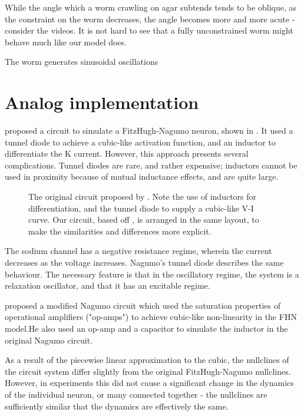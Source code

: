 \documentclass[
    11pt,
]{article}
\begin{document}
While the angle which a worm crawling on agar subtends tends to be oblique, as the constraint on the worm decreases, the angle becomes more and more acute - consider the videos.  It is not hard to see that a fully unconstrained worm might behave much like our model does.

The worm generates sinusoidal oscillations


\section{Analog implementation}

\citet{nagumo1962} proposed a circuit to simulate a FitzHugh-Nagumo neuron, shown in .  It used a tunnel diode to achieve a cubic-like activation function, and an inductor to differentiate the K current.  However, this approach presents several complications.  Tunnel diodes are rare, and rather expensive; inductors cannot be used in proximity because of mutual inductance effects, and are quite large.

\begin{figure}[h!]
    \centering
    \caption{The original circuit proposed by \citet{nagumo1962}.  Note the use of inductors for differentiation, and the tunnel diode to supply a cubic-like V-I curve.  Our circuit, based off \citet{keener1983}, is arranged in the same layout, to make the similarities and differences more explicit.}
    \label{fig: nagumo_ckt}
\end{figure}

The sodium channel has a negative resistance regime, wherein the current decreases as the voltage increases.  Nagumo's tunnel diode describes the same behaviour.  The necessary feature is that in the oscillatory regime, the system is a relaxation oscillator, and that it has an excitable regime.

\citet{keener1983} proposed a modified Nagumo circuit which used the saturation properties of operational amplifiers ("op-amps") to achieve cubic-like non-linearity in the FHN  model.He also used an op-amp and a capacitor to simulate the inductor in the original Nagumo circuit.

As a result of the piecewise linear approximation to the cubic, the nullclines of the circuit system differ slightly from the original FitzHugh-Nagumo nullclines.  However, in experiments this did not cause a significant change in the dynamics of the individual neuron, or many connected together - the nullclines are sufficiently similar that the dynamics are effectively the same.
\end{document}
